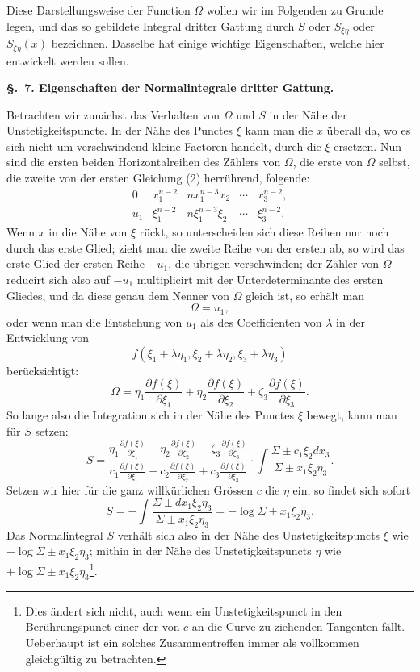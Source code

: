 \documentclass[10pt]{article}
\begin{document}
Diese Darstellungsweise der Function $\Omega$ wollen wir im Folgenden zu Grunde legen, und das so gebildete Integral dritter Gattung durch $S$ oder $S_{\xi\eta}$ oder $S_{\xi\eta}(x)$ bezeichnen. Dasselbe hat einige wichtige Eigenschaften, welche hier entwickelt werden sollen.

\begin{center}
{\bfseries \S.\ 7. Eigenschaften der Normalintegrale dritter Gattung.}
\end{center}

Betrachten wir zunächst das Verhalten von $\Omega$ und $S$ in der Nähe der Unstetigkeitspuncte. In der Nähe des Punctes $\xi$ kann man die $x$ überall da, wo es sich nicht um verschwindend kleine Factoren handelt, durch die $\xi$ ersetzen. Nun sind die ersten beiden Horizontalreihen des Zählers von $\Omega$, die erste von $\Omega$ selbst, die zweite von der ersten Gleichung (2) herrührend, folgende:
\[
\begin{array}{cccccc}
0 & x_1^{n-2} & nx_1^{n-3}x_2 & \cdots & x_3^{n-2},\\
u_1 & \xi_1^{n-2} & n\xi_1^{n-3}\xi_2 & \cdots & \xi_3^{n-2}.
\end{array}
\]
Wenn $x$ in die Nähe von $\xi$ rückt, so unterscheiden sich diese Reihen nur noch durch das erste Glied; zieht man die zweite Reihe von der ersten ab, so wird das erste Glied der ersten Reihe $-u_1$, die übrigen verschwinden; der Zähler von $\Omega$ reducirt sich also auf $-u_1$ multiplicirt mit der Unterdeterminante des ersten Gliedes, und da diese genau dem Nenner von $\Omega$ gleich ist, so erhält man
\[
\Omega=u_1,
\]
oder wenn man die Entstehung von $u_1$ als des Coefficienten von $\lambda$ in der Entwicklung von
\[
f(\xi_1+\lambda\eta_1,\xi_2+\lambda\eta_2,\xi_3+\lambda\eta_3)
\]
berücksichtigt:
\[
\Omega=\eta_1\frac{\partial f(\xi)}{\partial \xi_1}+\eta_2\frac{\partial f(\xi)}{\partial \xi_2}+\zeta_3\frac{\partial f(\xi)}{\partial \xi_3}.
\]
So lange also die Integration sich in der Nähe des Punctes $\xi$ bewegt, kann man für $S$ setzen:
\[
S=\frac{\eta_1\frac{\partial f(\xi)}{\partial \xi_1}+\eta_2\frac{\partial f(\xi)}{\partial \xi_2}+\zeta_3\frac{\partial f(\xi)}{\partial \xi_3}}{c_1\frac{\partial f(\xi)}{\partial \xi_1}+c_2\frac{\partial f(\xi)}{\partial \xi_2}+c_3\frac{\partial f(\xi)}{\partial \xi_3}}
\cdot
\int\frac{\Sigma\pm c_1\xi_2dx_3}{\Sigma\pm x_1\xi_2\eta_3}.
\]
Setzen wir hier für die ganz willkürlichen Grössen $c$ die $\eta$ ein, so findet sich sofort
\[
S=-\int\frac{\Sigma\pm dx_1\xi_2\eta_3}{\Sigma\pm x_1\xi_2\eta_3}=-\log\Sigma\pm x_1\xi_2\eta_3.
\]
Das Normalintegral $S$ verhält sich also in der Nähe des Unstetigkeitspuncts $\xi$ wie $-\log\Sigma\pm x_1\xi_2\eta_3$; mithin in der Nähe des Unstetigkeitspuncts $\eta$ wie $+\log\Sigma\pm x_1\xi_2\eta_3$\footnote{Dies ändert sich nicht, auch wenn ein Unstetigkeitspunct in den Berührungspunct einer der von $c$ an die Curve zu ziehenden Tangenten fällt. Ueberhaupt ist ein solches Zusammentreffen immer als vollkommen gleichgültig zu betrachten.}.
\end{document}
